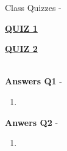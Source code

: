 \documentclass[a4paper,30pt]{report}
\begin{document}
      Class Quizzes - \\
      \par \href{https://www.ieltsbuddy.com/collocation-quiz.html?authuser=1}{\textbf{QUIZ 1}} 
      \par \href{https://www.ldoceonline.com/quiz/section-collocations/?authuser=1}{\textbf{QUIZ 2}}\\\\


      \par \textbf{Answers Q1} - 
      \begin{enumerate}
        \item 
      \end{enumerate}

      \par \textbf{Anwers Q2} - 
      \begin{enumerate}
        \item 
      \end{enumerate}
\end{document}
